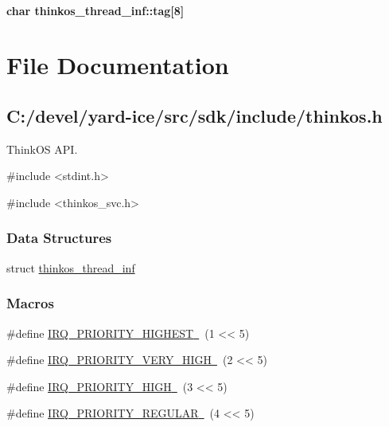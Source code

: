{\paragraph{\texorpdfstring{{char
thinkos\_thread\_inf::tag{[}8{]}}}{char thinkos\_thread\_inf::tag{[}8{]}}}\label{h.3vac5uf}

{}

\section{\texorpdfstring{{File
Documentation}}{File Documentation}}\label{file-documentation}

\subsection{\texorpdfstring{{C:/devel/yard-ice/src/sdk/include/thinkos.h}}{C:/devel/yard-ice/src/sdk/include/thinkos.h}}\label{cdevelyard-icesrcsdkincludethinkos.h}

{}

{ThinkOS API. }

{\#include \textless{}stdint.h\textgreater{}}

{\#include \textless{}thinkos\_svc.h\textgreater{}}

\subsubsection{\texorpdfstring{{Data
Structures}}{Data Structures}}\label{data-structures-1}

{struct }{\protect\hyperlink{h.2iq8gzs}{thinkos\_thread\_inf}}

\subsubsection{\texorpdfstring{{Macros}}{Macros}}\label{macros}

{\#define
}{\protect\hyperlink{h.39kk8xu}{IRQ\_PRIORITY\_HIGHEST}}{\protect\hyperlink{h.39kk8xu}{~}}{~(1
\textless{}\textless{} 5)}

{\#define
}{\protect\hyperlink{h.1opuj5n}{IRQ\_PRIORITY\_VERY\_HIGH}}{\protect\hyperlink{h.1opuj5n}{~}}{~(2
\textless{}\textless{} 5)}

{\#define
}{\protect\hyperlink{h.48pi1tg}{IRQ\_PRIORITY\_HIGH}}{\protect\hyperlink{h.48pi1tg}{~}}{~(3
\textless{}\textless{} 5)}

{\#define
}{\protect\hyperlink{h.2nusc19}{IRQ\_PRIORITY\_REGULAR}}{\protect\hyperlink{h.2nusc19}{~}}{~(4
\textless{}\textless{} 5)}

}

